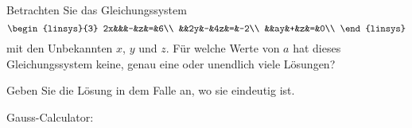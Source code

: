 Betrachten Sie das Gleichungssystem
\[
\begin{linsys}{3}
2x&&&-&z&=&6\\
&&2y&-&4z&=&-2\\
&&ay&+&z&=&0\\
\end{linsys}
\]
mit den Unbekannten $x$, $y$ und $z$. Für welche Werte von $a$
hat dieses Gleichungssystem keine, genau eine oder unendlich viele
Lösungen?

Geben Sie die Lösung in dem Falle an, wo sie eindeutig ist.

\begin{hinweis}
Gauss-Calculator: 
\end{hinweis}


